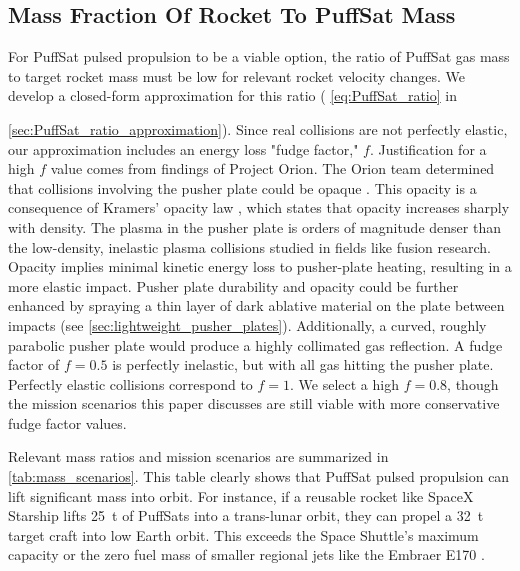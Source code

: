 \documentclass{article}
\begin{document}
\subsection{Mass Fraction Of Rocket To PuffSat Mass}
For PuffSat pulsed propulsion to be a viable option, the ratio of PuffSat gas mass to target rocket mass must be low for relevant rocket velocity changes. We develop a closed-form approximation for this ratio ( \autoref{eq:PuffSat_ratio} in {\autoref{sec:PuffSat_ratio_approximation}). Since real collisions are not perfectly elastic, our approximation includes an energy loss "fudge factor," $f$.  Justification for a high $f$ value comes from findings of Project Orion. The Orion team determined that collisions involving the pusher plate could be opaque  \cite{orion_reflections}. This opacity is a consequence of Kramers' opacity law \cite{kramers1928diffusion}, which states that opacity increases sharply with density. The plasma in the pusher plate is orders of magnitude denser than the low-density, inelastic plasma collisions studied in fields like fusion research.  Opacity implies minimal kinetic energy loss to pusher-plate heating, resulting in a more elastic impact. Pusher plate durability and opacity could be further enhanced by spraying a thin layer of dark ablative material  on the plate between impacts (see \autoref{sec:lightweight_pusher_plates}).   Additionally, a curved, roughly parabolic pusher plate would produce a  highly collimated gas reflection. A fudge factor of $f=0.5$ is perfectly inelastic, but with all gas hitting the pusher plate. Perfectly elastic collisions correspond to $f=1$.  We select a high $f=0.8$, though the mission scenarios this paper discusses are still viable with more conservative fudge factor values.   

Relevant mass ratios and mission scenarios are summarized in \autoref{tab:mass_scenarios}. This table clearly shows that PuffSat pulsed propulsion can lift significant mass into orbit. For instance, if a reusable rocket like SpaceX Starship \cite{starship} lifts \SI{25}{\tonne} of PuffSats into a trans-lunar orbit, they can propel a  \SI{32}{\tonne} target craft into low Earth orbit. This exceeds the Space Shuttle's maximum capacity \cite{space_shuttle_program} or the zero fuel mass of smaller regional jets like the Embraer E170 \cite{embraer_e170}.

}
\end{document}
